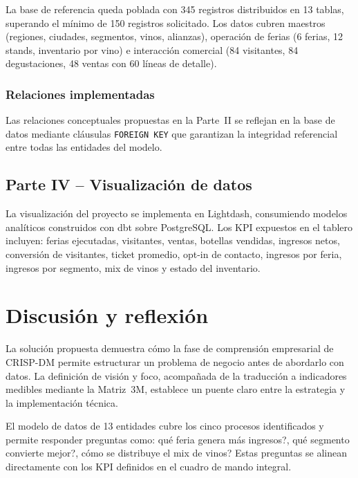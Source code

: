 \documentclass[10pt,a4paper]{article}
\begin{document}
La base de referencia queda poblada con 345 registros distribuidos en 13 tablas, superando el m\'inimo de 150 registros solicitado. Los datos cubren maestros (regiones, ciudades, segmentos, vinos, alianzas), operaci\'on de ferias (6 ferias, 12 stands, inventario por vino) e interacci\'on comercial (84 visitantes, 84 degustaciones, 48 ventas con 60 l\'ineas de detalle).

\subsubsection{Relaciones implementadas}

Las relaciones conceptuales propuestas en la Parte~II se reflejan en la base de datos mediante cl\'ausulas \texttt{FOREIGN KEY} que garantizan la integridad referencial entre todas las entidades del modelo.

\subsection{Parte IV -- Visualizaci\'on de datos}

La visualizaci\'on del proyecto se implementa en Lightdash, consumiendo modelos anal\'iticos construidos con dbt sobre PostgreSQL. Los KPI expuestos en el tablero incluyen: ferias ejecutadas, visitantes, ventas, botellas vendidas, ingresos netos, conversi\'on de visitantes, ticket promedio, opt-in de contacto, ingresos por feria, ingresos por segmento, mix de vinos y estado del inventario.

\section{Discusi\'on y reflexi\'on}

La soluci\'on propuesta demuestra c\'omo la fase de comprensi\'on empresarial de CRISP-DM permite estructurar un problema de negocio antes de abordarlo con datos. La definici\'on de visi\'on y foco, acompa\~nada de la traducci\'on a indicadores medibles mediante la Matriz~3M, establece un puente claro entre la estrategia y la implementaci\'on t\'ecnica.

El modelo de datos de 13 entidades cubre los cinco procesos identificados y permite responder preguntas como: \textquestiondown qu\'e feria genera m\'as ingresos?, \textquestiondown qu\'e segmento convierte mejor?, \textquestiondown c\'omo se distribuye el mix de vinos? Estas preguntas se alinean directamente con los KPI definidos en el cuadro de mando integral.
\end{document}
